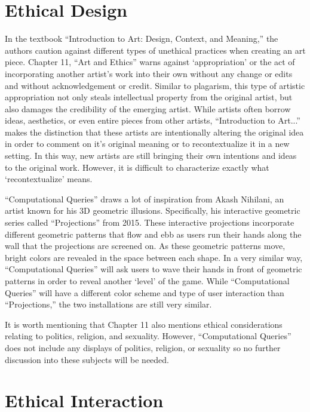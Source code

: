 \documentclass[10pt,twocolumn]{article}
\begin{document}
\section{Ethical Design}\label{sec:design}

In the textbook ``Introduction to Art: Design, Context, and Meaning,'' \cite{blood_introduction_nodate}the authors caution against different types of unethical practices when creating an art piece.  Chapter 11, ``Art and Ethics'' warns against `appropriation' or the act of incorporating another artist's work into their own without any change or edits and without acknowledgement or credit. Similar to plagarism, this type of artistic appropriation not only steals intellectual property from the original artist, but also damages the credibility of the emerging artist.  While artists often borrow ideas, aesthetics, or even entire pieces from other artists, ``Introduction to Art...'' makes the distinction that these artists are intentionally altering the original idea in order to comment on it's original meaning or to recontextualize it in a new setting. In this way, new artists are still bringing their own intentions and ideas to the original work.  However, it is difficult to characterize exactly what `recontextualize' means. 

``Computational Queries'' draws a lot of inspiration from Akash Nihilani, an artist known for his 3D geometric illusions. Specifically, his interactive geometric series called ``Projections'' from 2015.  These interactive projections incorporate different geometric patterns that flow and ebb as users run their hands along the wall that the projections are screened on. As these geometric patterns move, bright colors are revealed in the space between each shape.  In a very similar way, ``Computational Queries'' will ask users to wave their hands in front of geometric patterns in order to reveal another `level' of the game.  While ``Computational Queries'' will have a different color scheme and type of user interaction than ``Projections,'' the two installations are still very similar.  

It is worth mentioning that Chapter 11 also mentions ethical considerations relating to politics, religion, and sexuality.  However, ``Computational Queries'' does not include any displays of politics, religion, or sexuality so no further discussion into these subjects will be needed.

\section{Ethical Interaction}\label{sec:interaction}
\end{document}

